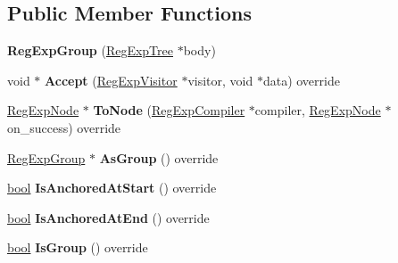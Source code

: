 \subsection*{Public Member Functions}
\begin{DoxyCompactItemize}
\item 
\mbox{\label{classv8_1_1internal_1_1RegExpGroup_abe3db3e49aa5fbde27e7508d3538bb20}} 
{\bfseries Reg\+Exp\+Group} (\mbox{\hyperlink{classv8_1_1internal_1_1RegExpTree}{Reg\+Exp\+Tree}} $\ast$body)
\item 
\mbox{\label{classv8_1_1internal_1_1RegExpGroup_ad33a996c4becd50a1e5aa99892d770bb}} 
void $\ast$ {\bfseries Accept} (\mbox{\hyperlink{classv8_1_1internal_1_1RegExpVisitor}{Reg\+Exp\+Visitor}} $\ast$visitor, void $\ast$data) override
\item 
\mbox{\label{classv8_1_1internal_1_1RegExpGroup_a80676cae598bfb5b98182a2f836e024d}} 
\mbox{\hyperlink{classv8_1_1internal_1_1RegExpNode}{Reg\+Exp\+Node}} $\ast$ {\bfseries To\+Node} (\mbox{\hyperlink{classv8_1_1internal_1_1RegExpCompiler}{Reg\+Exp\+Compiler}} $\ast$compiler, \mbox{\hyperlink{classv8_1_1internal_1_1RegExpNode}{Reg\+Exp\+Node}} $\ast$on\+\_\+success) override
\item 
\mbox{\label{classv8_1_1internal_1_1RegExpGroup_aeaa333dfd9f9cd1d06b8dbdc6fd7aa85}} 
\mbox{\hyperlink{classv8_1_1internal_1_1RegExpGroup}{Reg\+Exp\+Group}} $\ast$ {\bfseries As\+Group} () override
\item 
\mbox{\label{classv8_1_1internal_1_1RegExpGroup_a181b64de65cb774d5507ace764485e98}} 
\mbox{\hyperlink{classbool}{bool}} {\bfseries Is\+Anchored\+At\+Start} () override
\item 
\mbox{\label{classv8_1_1internal_1_1RegExpGroup_aa449fb935d9206c51ee728f863c27b9c}} 
\mbox{\hyperlink{classbool}{bool}} {\bfseries Is\+Anchored\+At\+End} () override
\item 
\mbox{\label{classv8_1_1internal_1_1RegExpGroup_aea138c20d21c565b270e951c3747659d}} 
\mbox{\hyperlink{classbool}{bool}} {\bfseries Is\+Group} () override

\end{DoxyCompactItemize}

